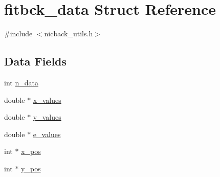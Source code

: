 \hypertarget{structfitbck__data}{
\section{fitbck\_\-data Struct Reference}
\label{structfitbck__data}
}


{\ttfamily \#include $<$nicback\_\-utils.h$>$}\subsection*{Data Fields}
\begin{DoxyCompactItemize}
\item 
int \hyperlink{structfitbck__data_aa980ba0a19fd1a9513ff5fc724d2e8b5}{n\_\-data}
\item 
double $\ast$ \hyperlink{structfitbck__data_a52a17fe78183bb8860c15923aafd995b}{x\_\-values}
\item 
double $\ast$ \hyperlink{structfitbck__data_ab6579e3cb28969ab1280ed85353c09dc}{y\_\-values}
\item 
double $\ast$ \hyperlink{structfitbck__data_ab949bb327e0452787c34d4bf67358b6d}{e\_\-values}
\item 
int $\ast$ \hyperlink{structfitbck__data_a6a60c88543b3866c7cc21960df1b8747}{x\_\-pos}
\item 
int $\ast$ \hyperlink{structfitbck__data_aeffa672e102b731832b1e87aa9a8b933}{y\_\-pos}
\end{DoxyCompactItemize}


